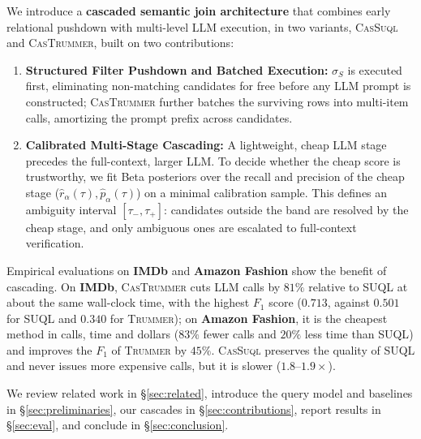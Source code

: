 We introduce a \textbf{cascaded semantic join architecture} that combines early relational pushdown with multi-level LLM execution, in two variants, \textsc{CasSuql} and \textsc{CasTrummer}, built on two contributions:
\begin{enumerate}
    \item \textbf{Structured Filter Pushdown and Batched Execution:} $\sigma_S$ is executed first, eliminating non-matching candidates for free before any LLM prompt is constructed; \textsc{CasTrummer} further batches the surviving rows into multi-item calls, amortizing the prompt prefix across candidates.
    \item \textbf{Calibrated Multi-Stage Cascading:} A lightweight, cheap LLM stage precedes the full-context, larger LLM. To decide whether the cheap score is trustworthy, we fit Beta posteriors over the recall and precision of the cheap stage ($\hat{r}_\alpha(\tau), \hat{p}_\alpha(\tau)$) on a minimal calibration sample. This defines an ambiguity interval $[\tau_-, \tau_+]$: candidates outside the band are resolved by the cheap stage, and only ambiguous ones are escalated to full-context verification.
\end{enumerate}

Empirical evaluations on \textbf{IMDb} and \textbf{Amazon Fashion} show the benefit of cascading. On \textbf{IMDb}, \textsc{CasTrummer} cuts LLM calls by $81\%$ relative to \textsc{SUQL} at about the same wall-clock time, with the highest $F_1$ score ($0.713$, against $0.501$ for \textsc{SUQL} and $0.340$ for \textsc{Trummer}); on \textbf{Amazon Fashion}, it is the cheapest method in calls, time and dollars ($83\%$ fewer calls and $20\%$ less time than \textsc{SUQL}) and improves the $F_1$ of \textsc{Trummer} by $45\%$. \textsc{CasSuql} preserves the quality of \textsc{SUQL} and never issues more expensive calls, but it is slower ($1.8$--$1.9\times$).

We review related work in \S\ref{sec:related}, introduce the query model and baselines in \S\ref{sec:preliminaries}, our cascades in \S\ref{sec:contributions}, report results in \S\ref{sec:eval}, and conclude in \S\ref{sec:conclusion}.
